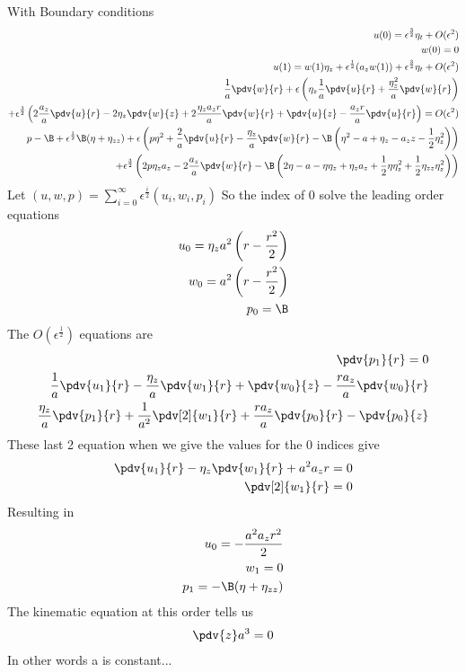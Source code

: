 \documentclass[12pt]{article}
\newcommand{\rt}{^{\frac{1}{2}}}
\newcommand{\rtt}{^{\frac{3}{2}}}
\begin{document}
	With Boundary conditions 
	\begin{align}
	u(0) = \epsilon\rtt\eta_t +O(\epsilon^2)\\
	w(0) = 0 \\
	u(1) =w(1)\eta_z +\epsilon\rt(a_z w(1)) +\epsilon\rtt\eta_t +O(\epsilon^2)\\
	\frac{1}{a}\pdv{w}{r}+\epsilon\left(\eta_z\frac{1}{a}\pdv{u}{r}+\frac{\eta_z^2}{a}\pdv{w}{r}\right)\\
	+\epsilon\rtt\left(2\frac{a_z}{a}\pdv{u}{r}-2\eta_z\pdv{w}{z}+2\frac{\eta_za_zr}{a}\pdv{w}{r}+\pdv{u}{z}-\frac{a_zr}{a}\pdv{u}{r}\right)=O(\epsilon^2)\\
	p-\B+\epsilon\rt\B(\eta+\eta_{zz})+\epsilon\left(p\eta^2+\frac{2}{a}\pdv{u}{r}-\frac{\eta_z}{a}\pdv{w}{r}-\B\left(\eta^2-a+\eta_z-a_zz-\frac{1}{2}\eta_z^2\right)\right)\\
	+\epsilon\rtt\left(2p\eta_za_z-2\frac{a_z}{a}\pdv{w}{r}-\B\left(2\eta-a-\eta\eta_z+\eta_za_z+\frac{1}{2}\eta\eta_z^2+\frac{1}{2}\eta_{zz}\eta_z^2\right)\right)
	\end{align}
Let  $(u,w,p)= \sum_{i=0}^{\infty} \epsilon^{\frac{i}{2}}(u_i,w_i,p_i)$ So the index of 0 solve the leading order equations
	\begin{align}
	u_0 = \eta_za^2\left(r-\frac{r^2}{2}\right)\\
	w_0= a^2\left(r-\frac{r^2}{2}\right)\\
	p_0= \B
	\end{align}
	The $O(\epsilon\rt)$ equations are
	\begin{align}
	\pdv{p_1}{r} = 0\\
	\frac{1}{a}\pdv{u_1}{r}-\frac{\eta_z}{a}\pdv{w_1}{r}+ \pdv{w_0}{z}-\frac{r a_z}{a}\pdv{w_0}{r}\\
	\frac{\eta_z}{a}\pdv{p_1}{r}+ \frac{1}{a^2}\pdv[2]{w_1}{r}+\frac{ra_z}{a}\pdv{p_0}{r}-\pdv{p_0}{z}
	\end{align}
	These last 2 equation when we give the values for the 0 indices give
	\begin{align}
	\pdv{u_1}{r}-\eta_z\pdv{w_1}{r}+a^2a_z r = 0\\
	\pdv[2]{w_1}{r} = 0
	\end{align}
	Resulting in
	\begin{align}
	u_0 =-\frac{a^2a_zr^2}{2}  \\
	w_1 = 0\\
	p_1 = -\B(\eta+\eta_{zz})
	\end{align}
	The kinematic equation at this order tells us 
	\begin{align}
	\pdv{z}a^3 =0
	\end{align}
	In other words a is constant...
	
\end{document}
